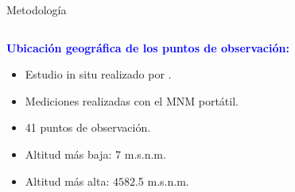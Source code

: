 
    \begin{frame}{Metodología} %
        \justifying %
        \vspace*{-0.3cm} %

        \begin{columns}
            \begin{column}{0.5\textwidth} %
                \textcolor{blue}{\textbf{Ubicación geográfica de los puntos de observación:}}
                \begin{itemize}
                    \item Estudio in situ realizado por \cite{lara2016}.
                    \item Mediciones realizadas con el MNM portátil.
                    \item 41 puntos de observación.
                    \item Altitud más baja: $7$ m.s.n.m.
                    \item Altitud más alta: $4582$.5 m.s.n.m.
                \end{itemize}
            \end{column}


\end{columns}
\end{frame}
